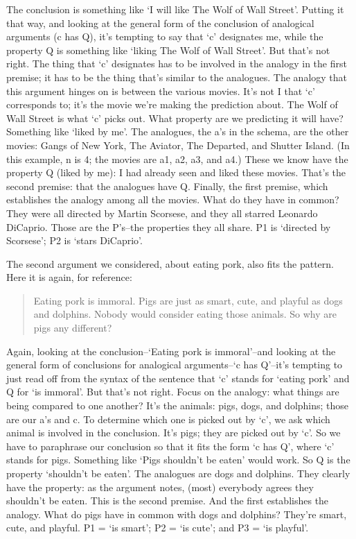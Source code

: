 The conclusion is something like `I will like The Wolf of Wall Street'. Putting it that way, and
looking at the general form of the conclusion of analogical arguments (c has Q), it's tempting to
say that `c' designates me, while the property Q is something like `liking The Wolf of Wall Street'.
But that's not right. The thing that `c' designates has to be involved in the analogy in the first
premise; it has to be the thing that's similar to the analogues. The analogy that this argument hinges
on is between the various movies. It's not I that `c' corresponds to; it's the movie we're making
the prediction about. The Wolf of Wall Street is what `c' picks out. What property are we predicting
it will have? Something like `liked by me'. The analogues, the a's in the schema, are the other
movies: Gangs of New York, The Aviator, The Departed, and Shutter Island. (In this example, n is
4; the movies are a1, a2, a3, and a4.) These we know have the property Q (liked by me): I had
already seen and liked these movies. That's the second premise: that the analogues have Q. Finally,
the first premise, which establishes the analogy among all the movies. What do they have in
common? They were all directed by Martin Scorsese, and they all starred Leonardo DiCaprio.
Those are the P's--the properties they all share. P1 is `directed by Scorsese'; P2 is `stars DiCaprio'.

The second argument we considered, about eating pork, also fits the pattern. Here it is again, for
reference:

\begin{quote}Eating pork is immoral. Pigs are just as smart, cute, and playful as dogs and dolphins.
Nobody would consider eating those animals. So why are pigs any different?
\end{quote}

Again, looking at the conclusion--`Eating pork is immoral'--and looking at the general form of
conclusions for analogical arguments--`c has Q'--it's tempting to just read off from the syntax of
the sentence that `c' stands for `eating pork' and Q for `is immoral'. But that's not right. Focus on
the analogy: what things are being compared to one another? It's the animals: pigs, dogs, and
dolphins; those are our a's and c. To determine which one is picked out by `c', we ask which
animal is involved in the conclusion. It's pigs; they are picked out by `c'. So we have to paraphrase
our conclusion so that it fits the form `c has Q', where `c' stands for pigs. Something like `Pigs
shouldn't be eaten' would work. So Q is the property `shouldn't be eaten'. The analogues are dogs
and dolphins. They clearly have the property: as the argument notes, (most) everybody agrees they
shouldn't be eaten. This is the second premise. And the first establishes the analogy. What do pigs
have in common with dogs and dolphins? They're smart, cute, and playful. P1 = `is smart'; P2 =
`is cute'; and P3 = `is playful'.

